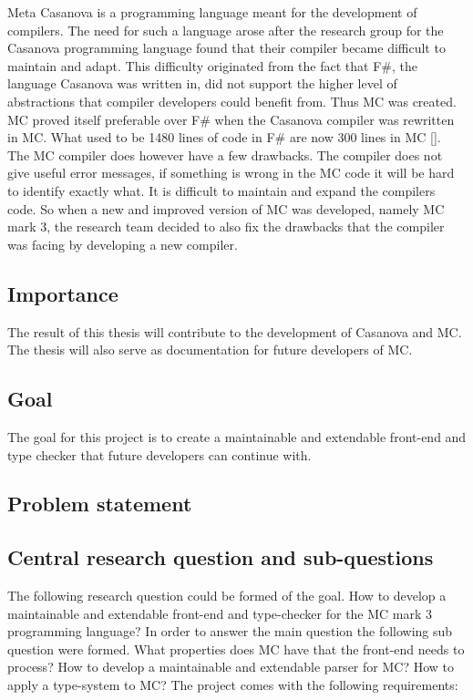 Meta Casanova is a programming language meant for the development of compilers. 
The need for such a language arose after the research group for the Casanova programming language found that their compiler became difficult to maintain and adapt. 
This difficulty originated from the fact that F\#, 
the language Casanova was written in, did not support the higher level of  abstractions that compiler developers could benefit from. 
Thus MC was created. 
MC proved itself preferable over F\# when the Casanova compiler was rewritten in MC. 
What used to be 1480 lines of code in F\# are now 300 lines in MC []. 
\linebreak
The MC compiler does however have a few drawbacks. 
The compiler does not give useful error messages, if something is wrong in the MC code it will be hard to identify exactly what. 
It is difficult to maintain and expand the compilers code. 
\linebreak
So when a new and improved version of MC was developed, namely MC mark 3,  
the research team decided to also fix the drawbacks that the compiler was facing by developing a new compiler. 


\subsection{Importance}
The result of this thesis will contribute to the development of Casanova and MC.
The thesis will also serve as documentation for future developers of MC.

\subsection{Goal}\label{sec:goalsmandate}
The goal for this project is to create a maintainable and extendable front-end and type checker that future developers can continue with.

\subsection{Problem statement}


\subsection{Central research question and sub-questions}
The following research question could be formed of the goal. 
   How to develop a maintainable and extendable front-end and type-checker for the MC mark 3 programming language?
In order to answer the main question the following sub question were formed.
   What properties does MC have that the front-end needs to process?
   How to develop a maintainable and extendable parser for MC?
   How to apply a type-system to MC?
The project comes with the following requirements:

